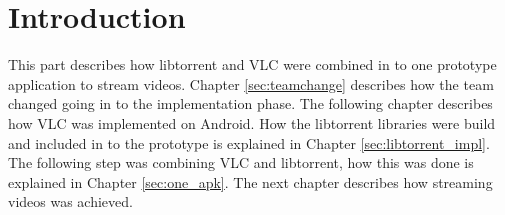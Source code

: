 \chapter{Introduction}
\thispagestyle{fancy}
This part describes how libtorrent and VLC were combined in to one prototype application to stream videos. Chapter \ref{sec:teamchange} describes how the team changed going in to the implementation phase. The following chapter describes how VLC was implemented on Android. How the libtorrent libraries were build and included in to the prototype is explained in Chapter \ref{sec:libtorrent_impl}. The following step was combining VLC and libtorrent, how this was done is explained in Chapter \ref{sec:one_apk}. The next chapter describes how streaming videos was achieved.